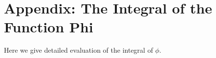 \documentclass[10pt]{article}
\theoremstyle{plain}
\theoremstyle{definition}
\begin{document}
	
	
	
	
	
	
	
	
	
	
	
	
	
	
	
	
	
	\appendix
	\setcounter{theorem}{0}
	\setcounter{lemma}{0}
	\setcounter{proposition}{0}
	\setcounter{definition}{0}
	\renewcommand{\thetheorem}{\Alph{section}.\arabic{theorem}}
	\renewcommand{\thelemma}{\Alph{section}.\arabic{lemma}}
	\renewcommand{\theproposition}{\Alph{section}.\arabic{proposition}}
	\renewcommand{\thedefinition}{\Alph{section}.\arabic{definition}}
	\section{Appendix: The Integral of the Function Phi}\label{appendix:phi-integral}
	Here we give detailed evaluation of the integral of $\phi$.
\end{document}
